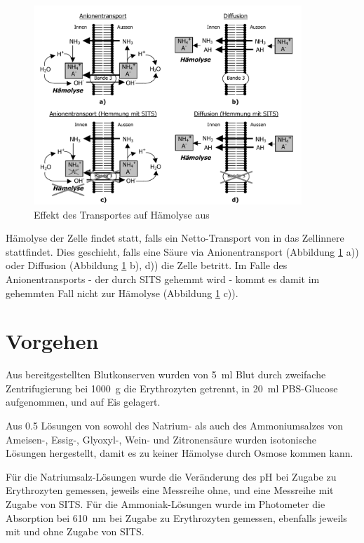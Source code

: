 \documentclass[a4paper,german]{scrreprt}
\begin{document}
\begin{figure}[h]
	\centering
	\includegraphics[width=0.9\textwidth]{img/th_transport_haem}
	\caption{Effekt des Transportes auf Hämolyse aus \cite{skriptv6}}
	\label{fig:transport_haem}
\end{figure}

Hämolyse der Zelle findet statt, falls ein Netto-Transport von  in das
Zellinnere stattfindet. Dies geschieht, falls eine Säure via Anionentransport
(Abbildung \ref{fig:transport_haem} a)) oder Diffusion (Abbildung
\ref{fig:transport_haem} b), d)) die Zelle betritt. Im Falle des
Anionentransports - der durch SITS gehemmt wird - kommt es damit im gehemmten
Fall nicht zur Hämolyse (Abbildung \ref{fig:transport_haem} c)).

\section{Vorgehen}

Aus bereitgestellten Blutkonserven wurden von \SI{5}{ml} Blut durch zweifache
Zentrifugierung bei \SI{1000}{g} die Erythrozyten getrennt, in \SI{20}{ml} PBS-Glucose
aufgenommen, und auf Eis gelagert.

Aus \SI{0.5}{\Molar} Lösungen von sowohl des Natrium- als auch des
Ammoniumsalzes von Ameisen-, Essig-, Glyoxyl-, Wein- und Zitronensäure wurden
isotonische Lösungen hergestellt, damit es zu keiner Hämolyse durch Osmose
kommen kann.

Für die Natriumsalz-Lösungen wurde die Veränderung des pH bei Zugabe zu
Erythrozyten gemessen, jeweils eine Messreihe ohne, und eine Messreihe mit
Zugabe von SITS. Für die Ammoniak-Lösungen wurde im Photometer die Absorption
bei \SI{610}{nm} bei Zugabe zu Erythrozyten gemessen, ebenfalls jeweils mit und
ohne Zugabe von SITS.
\end{document}
